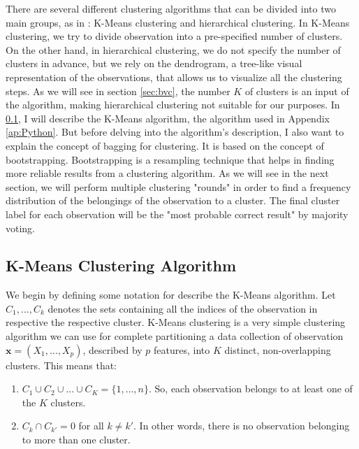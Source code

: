 There are several different clustering algorithms that can be divided into two main groups, as in \cite{james_introduction_2021}: K-Means clustering and hierarchical clustering. In K-Means clustering, we try to divide observation into a pre-specified number of clusters. On the other hand, in hierarchical clustering, we do not specify the number of clusters in advance, but we rely on the dendrogram, a tree-like visual representation of the observations, that allows us to visualize all the clustering steps. As we will see in section \ref{sec:bvc}, the number $K$ of clusters is an input of the algorithm, making hierarchical clustering not suitable for our purposes. In \ref{subsec:kmeans}, I will describe the K-Means algorithm, the algorithm used in Appendix \ref{ap:Python}. But before delving into the algorithm's description, I also want to explain the concept of bagging for clustering. It is based on the concept of bootstrapping. Bootstrapping is a resampling technique that helps in finding more reliable results from a clustering algorithm. As we will see in the next section, we will perform multiple clustering "rounds" in order to find a frequency distribution of the belongings of the observation to a cluster.
The final cluster label for each observation will be the "most probable correct result" by majority voting.

\subsection{K-Means Clustering Algorithm}
\label{subsec:kmeans}
We begin by defining some notation for describe the K-Means algorithm. Let $C_1,\dots,C_k$ denotes the sets containing all the indices of the observation in respective the respective cluster. K-Means clustering is a very simple clustering algorithm we can use for complete partitioning a data collection of observation $\mathbf{x}=\left(X_1, \dots, X_p \right)$, described by $p$ features, into $K$ distinct, non-overlapping clusters. This means that:
\begin{enumerate}
    \item $C_1 \cup C_2 \cup \dots \cup C_K=\{1,\dots,n\}$. So, each observation belongs to at least one of the $K$ clusters.
    \item $C_k\cap C_{k'}=0$ for all $k\neq k'$. In other words, there is no observation belonging to more than one cluster.
\end{enumerate}

